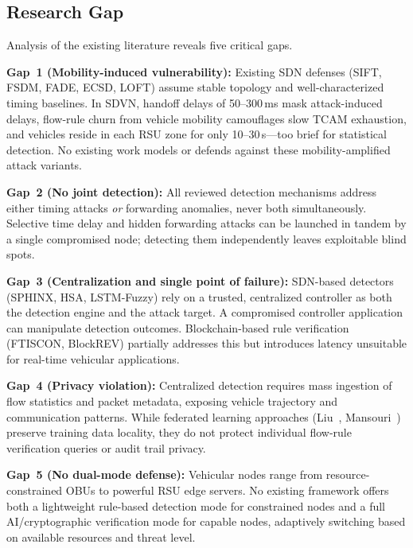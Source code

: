 \documentclass[12pt, a4paper]{report}
\begin{document}
\subsection{Research Gap}

Analysis of the existing literature reveals five critical gaps.

\textbf{Gap~1 (Mobility-induced vulnerability):} Existing SDN defenses (SIFT, FSDM, FADE, ECSD, LOFT) assume stable topology and well-characterized timing baselines. In SDVN, handoff delays of 50--300\,ms mask attack-induced delays, flow-rule churn from vehicle mobility camouflages slow TCAM exhaustion, and vehicles reside in each RSU zone for only 10--30\,s---too brief for statistical detection. No existing work models or defends against these mobility-amplified attack variants.

\textbf{Gap~2 (No joint detection):} All reviewed detection mechanisms address either timing attacks \emph{or} forwarding anomalies, never both simultaneously. Selective time delay and hidden forwarding attacks can be launched in tandem by a single compromised node; detecting them independently leaves exploitable blind spots.

\textbf{Gap~3 (Centralization and single point of failure):} SDN-based detectors (SPHINX, HSA, LSTM-Fuzzy) rely on a trusted, centralized controller as both the detection engine and the attack target. A compromised controller application can manipulate detection outcomes. Blockchain-based rule verification (FTISCON, BlockREV) partially addresses this but introduces latency unsuitable for real-time vehicular applications.

\textbf{Gap~4 (Privacy violation):} Centralized detection requires mass ingestion of flow statistics and packet metadata, exposing vehicle trajectory and communication patterns. While federated learning approaches (Liu~\cite{Liu2021BFLVEC}, Mansouri~\cite{Mansouri2024}) preserve training data locality, they do not protect individual flow-rule verification queries or audit trail privacy.

\textbf{Gap~5 (No dual-mode defense):} Vehicular nodes range from resource-constrained OBUs to powerful RSU edge servers. No existing framework offers both a lightweight rule-based detection mode for constrained nodes and a full AI/cryptographic verification mode for capable nodes, adaptively switching based on available resources and threat level.


\renewcommand{\arraystretch}{1.15}
\end{document}
